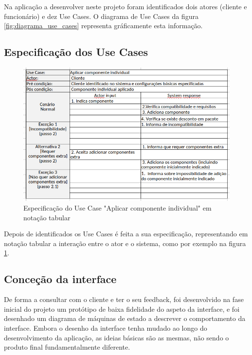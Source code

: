 \documentclass{llncs}
\begin{document}
Na aplicação a desenvolver neste projeto foram identificados dois atores (cliente e funcionário) e dez Use Cases. O diagrama de Use Cases da figura \ref{fig:diagrama_use_cases} representa gráficamente esta informação.

\subsection{Especificação dos Use Cases}

\begin{figure}
\begin{center}
\includegraphics[scale=0.40]{aplicar_componente_tabular.png} 
\end{center}
\caption{\label{fig:notacao_tabular}Especificação do Use Case "Aplicar componente individual" em notação tabular }
\end{figure} 

Depois de identificados os Use Cases é feita a sua especificação, representando em notação tabular a interação entre o ator e o sistema, como por exemplo na figura \ref{fig:notacao_tabular}.

\subsection{Conceção da interface}

De forma a consultar com o cliente e ter o seu feedback, foi desenvolvido na fase inicial do projeto um protótipo de baixa fidelidade do aspeto da interface, e foi desenhado um diagrama de máquinas de estado a descrever o comportamento da interface. Embora o desenho da interface tenha mudado ao longo do desenvolvimento da aplicação, as ideias básicas são as mesmas, não sendo o produto final fundamentalmente diferente.
\end{document}
